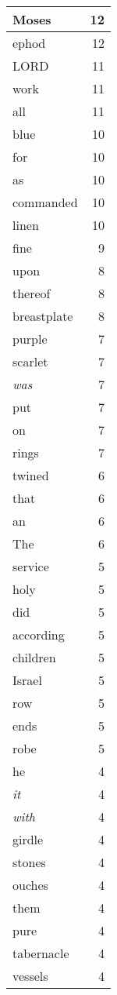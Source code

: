 \begin{center}
\begin{longtable}{l|r}
Moses & 12 \\ \hline
ephod & 12 \\ \hline
LORD & 11 \\ \hline
work & 11 \\ \hline
all & 11 \\ \hline
blue & 10 \\ \hline
for & 10 \\ \hline
as & 10 \\ \hline
commanded & 10 \\ \hline
linen & 10 \\ \hline
fine & 9 \\ \hline
upon & 8 \\ \hline
thereof & 8 \\ \hline
breastplate & 8 \\ \hline
purple & 7 \\ \hline
scarlet & 7 \\ \hline
\emph{was} & 7 \\ \hline
put & 7 \\ \hline
on & 7 \\ \hline
rings & 7 \\ \hline
twined & 6 \\ \hline
that & 6 \\ \hline
an & 6 \\ \hline
The & 6 \\ \hline
service & 5 \\ \hline
holy & 5 \\ \hline
did & 5 \\ \hline
according & 5 \\ \hline
children & 5 \\ \hline
Israel & 5 \\ \hline
row & 5 \\ \hline
ends & 5 \\ \hline
robe & 5 \\ \hline
he & 4 \\ \hline
\emph{it} & 4 \\ \hline
\emph{with} & 4 \\ \hline
girdle & 4 \\ \hline
stones & 4 \\ \hline
ouches & 4 \\ \hline
them & 4 \\ \hline
pure & 4 \\ \hline
tabernacle & 4 \\ \hline
vessels & 4 \\ \hline

\end{longtable}
\end{center}
